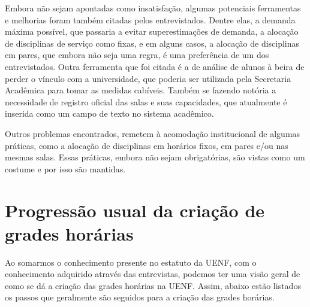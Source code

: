         Embora não sejam apontadas como insatisfação, algumas potenciais ferramentas e melhorias foram também citadas pelos entrevistados. Dentre elas, a demanda máxima possível, que passaria a evitar superestimações de demanda, a alocação de disciplinas de serviço como fixas, e em alguns casos, a alocação de disciplinas em pares, que embora não seja uma regra, é uma preferência de um dos entrevistados. Outra ferramenta que foi citada é a de análise de alunos à beira de perder o vínculo com a universidade, que poderia ser utilizada pela Secretaria Acadêmica para tomar as medidas cabíveis. Também se fazendo notória a necessidade de registro oficial das salas e suas capacidades, que atualmente é inserida como um campo de texto no sistema acadêmico.

        Outros problemas encontrados, remetem à acomodação institucional de algumas práticas, como a alocação de disciplinas em horários fixos, em pares e/ou nas mesmas salas. Essas práticas, embora não sejam obrigatórias, são vistas como um costume e por isso são mantidas.

\section{Progressão usual da criação de grades horárias} %


    Ao somarmos o conhecimento presente no estatuto da UENF, com o conhecimento adquirido através das entrevistas, podemos ter uma visão geral de como se dá a criação das grades horárias na UENF. Assim, abaixo estão listados os passos que geralmente são seguidos para a criação das grades horárias.


